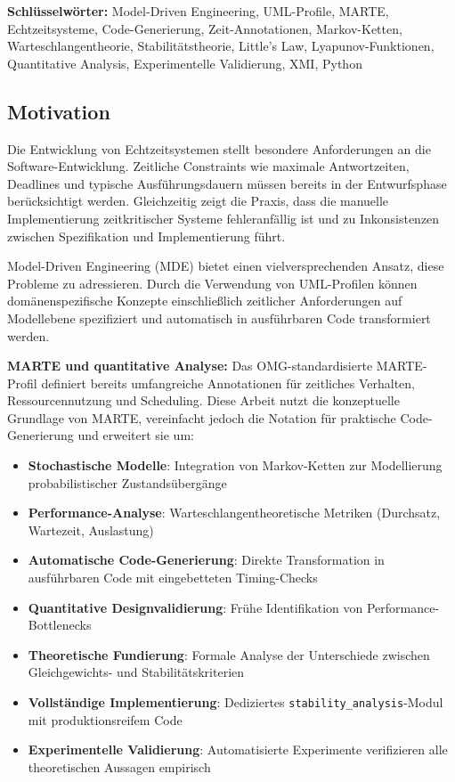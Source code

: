 ﻿\documentclass[a4paper,12pt]{scrreprt}
\theoremstyle{definition}
\begin{document}
\textbf{Schlüsselwörter:} Model-Driven Engineering, UML-Profile, MARTE,
Echtzeitsysteme, Code-Gene\-rierung, Zeit-Annotationen, Markov-Ketten,
Warteschlangentheorie, Stabilitätstheorie, Little's Law, Lyapunov-Funktionen,
Quantitative Analysis, Experimentelle Validierung, XMI, Python


\subsection{Motivation}

Die Entwicklung von Echtzeitsystemen stellt besondere Anforderungen an die Software-Entwicklung. Zeitliche Constraints wie maximale Antwortzeiten, Deadlines und typische Ausführungsdauern müssen bereits in der Entwurfsphase berücksichtigt werden. Gleichzeitig zeigt die Praxis, dass die manuelle Implementierung zeitkritischer Systeme fehleranfällig ist und zu Inkonsistenzen zwischen Spezifikation und Implementierung führt.

Model-Driven Engineering (MDE) bietet einen vielversprechenden Ansatz, diese Probleme zu adressieren. Durch die Verwendung von UML-Profilen können domänenspezifische Konzepte einschließlich zeitlicher Anforderungen auf Modellebene spezifiziert und automatisch in ausführbaren Code transformiert werden.

\textbf{MARTE und quantitative Analyse:} Das OMG-standardisierte MARTE-Profil \cite{marte} definiert bereits umfangreiche Annotationen für zeitliches Verhalten, Ressourcennutzung und Scheduling. Diese Arbeit nutzt die konzeptuelle Grundlage von MARTE, vereinfacht jedoch die Notation für praktische Code-Generierung und erweitert sie um:

\begin{itemize}
	\item[-] \textbf{Stochastische Modelle}: Integration von Markov-Ketten
	zur Modellierung probabilistischer Zustandsübergänge
	\item[-] \textbf{Performance-Analyse}: Warteschlangentheoretische Metriken
	(Durchsatz, Wartezeit, Auslastung)
	\item[-] \textbf{Automatische Code-Generierung}: Direkte Transformation in
	ausführbaren Code mit eingebetteten Timing-Checks
	\item[-] \textbf{Quantitative Designvalidierung}: Frühe Identifikation von
	Performance-Bottle\-necks
	\item[-] \textbf{Theoretische Fundierung}: Formale Analyse der Unterschiede
	zwischen Gleichge\-wichts- und Stabilitätskriterien
	\item[-] \textbf{Vollständige Implementierung}: Dediziertes
	\texttt{stability\_analysis}-Modul mit produktionsreifem Code
	\item[-] \textbf{Experimentelle Validierung}: Automatisierte Experimente
	verifizieren alle theoretischen Aussagen empirisch
\end{itemize}
\end{document}
